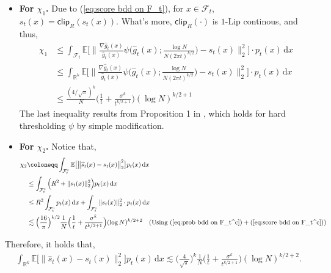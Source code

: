 \documentclass{article}
\newcommand{\defn}{\coloneqq}
\newcommand{\diff}{\,\mathrm{d}}
\newcommand{\clip}{\mathsf{clip}}
\theoremstyle{plain}
\theoremstyle{remark}
\begin{document}
\begin{itemize}
    \item \textbf{For $\chi_1$.}
    Due to (\ref{eq:score bdd on F_t}), for $x\in \mathcal{F}_t$, $s_t(x) = \clip_R(s_t(x))$. What's more, $\clip_R(\cdot)$ is $1$-Lip continous, and thus, 
    \begin{align*}
        \chi_1 &\leq \int_{\mathcal{F}_t}\mathbb{E}\big[\big\|\frac{\nabla \widehat{g}_t(x)}{\widehat{g}_t(x)} \psi\Big(\widehat{g}_t(x);\frac{\log N}{N(2\pi t)^{k/2}}\Big) -s_t(x)\big\|_2^2 \big]  \cdot p_t(x) \diff x \\
        & \leq \int_{\mathbb{R}^k}\mathbb{E}\big[\big\|\frac{\nabla \widehat{g}_t(x)}{\widehat{g}_t(x)} \psi\Big(\widehat{g}_t(x);\frac{\log N}{N(2\pi t)^{k/2}}\Big) -s_t(x)\big\|_2^2 \big]  \cdot p_t(x) \diff x \\
        &\leq \frac{(4/\sqrt{\pi})^k}{N} \Big( \frac{1}{t}+\frac{\sigma^k}{t^{k/2+1}}\Big) (\log N)^{k/2+1}
    \end{align*}
    The last inequality results from Proposition 1 in \citet{cai2025minimaxoptimalityprobabilityflow}, which holds for hard thresholding $\psi$ by simple modification.

    \item \textbf{For $\chi_2$.}
    Notice that, 
    \begin{align*}
        \chi_2 &\defn \int_{\mathcal{F}_t^c}\mathbb{E}\big[\big\| \widehat{s}_t(x) - s_t(x)\big\|_2^2 \big] p_t(x) \diff x \\
        &\leq \int_{\mathcal{F}_t^c} \Big( R^2 + \|s_t(x)\|_2^2\Big) p_t(x) \diff x \\
        &\leq R^2 \int_{\mathcal{F}_t^c} p_t(x) \diff x + \int_{\mathcal{F}_t^c}\|s_t(x)\|_2^2 \cdot  p_t(x) \diff x \\
        &\lesssim \Big( \frac{16}{\pi}\Big)^{k/2} \frac{1}{N} \Big( \frac{1}{t} + \frac{\sigma^k }{ t^{k/2+1}}\Big) (\log N)^{k/2+2} \quad (\text{Using }(\ref{eq:prob bdd on F_t^c}) + (\ref{eq:score bdd on F_t^c}))
    \end{align*}
\end{itemize}

Therefore, it holds that, 
\begin{align*}
    \int_{\mathbb{R}^k} \mathbb{E}\big[\big\| \widehat{s}_t(x) - s_t(x)\big\|_2^2 \big] p_t(x) \diff x \lesssim \Big( \frac{4}{\sqrt{\pi}}\Big)^{k} \frac{1}{N} \Big( \frac{1}{t} + \frac{\sigma^k }{ t^{k/2+1}}\Big) (\log N)^{k/2+2} .
\end{align*}
\end{document}
